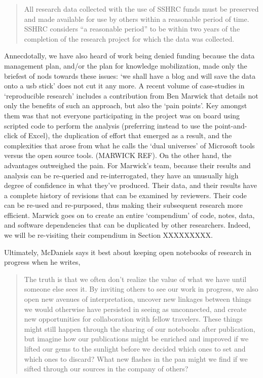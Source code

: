 \documentclass[english,]{book}
\begin{document}
\begin{quote}
All research data collected with the use of SSHRC funds must be
preserved and made available for use by others within a reasonable
period of time. SSHRC considers ``a reasonable period'' to be within two
years of the completion of the research project for which the data was
collected.
\end{quote}

Annecdotally, we have also heard of work being denied funding because
the data management plan, and/or the plan for knowledge mobilization,
made only the briefest of nods towards these issues: `we shall have a
blog and will save the data onto a usb stick' does not cut it any more.
A recent volume of case-studies in `reproducible research' includes a
contribution from Ben Marwick that details not only the benefits of such
an approach, but also the `pain points'. Key amongst them was that not
everyone participating in the project was on board using scripted code
to perform the analysis (preferring instead to use the point-and-click
of Excel), the duplication of effort that emerged as a result, and the
complexities that arose from what he calls the `dual universes' of
Microsoft tools versus the open source tools. (MARWICK REF). On the
other hand, the advantages outweighed the pain. For Marwick's team,
because their results and analysis can be re-queried and
re-interrogated, they have an unusually high degree of confidence in
what they've produced. Their data, and their results have a complete
history of revisions that can be examined by reviewers. Their code can
be re-used and re-purposed, thus making their subsequent research more
efficient. Marwick goes on to create an entire `compendium' of code,
notes, data, and software dependencies that can be duplicated by other
researchers. Indeed, we will be re-visiting their compendium in Section
XXXXXXXXX.

Ultimately, McDaniels says it best about keeping open notebooks of
research in progress when he writes,

\begin{quote}
The truth is that we often don't realize the value of what we have until
someone else sees it. By inviting others to see our work in progress, we
also open new avenues of interpretation, uncover new linkages between
things we would otherwise have persisted in seeing as unconnected, and
create new opportunities for collaboration with fellow travelers. These
things might still happen through the sharing of our notebooks after
publication, but imagine how our publications might be enriched and
improved if we lifted our gems to the sunlight before we decided which
ones to set and which ones to discard? What new flashes in the pan might
we find if we sifted through our sources in the company of others?
\end{quote}
\end{document}
